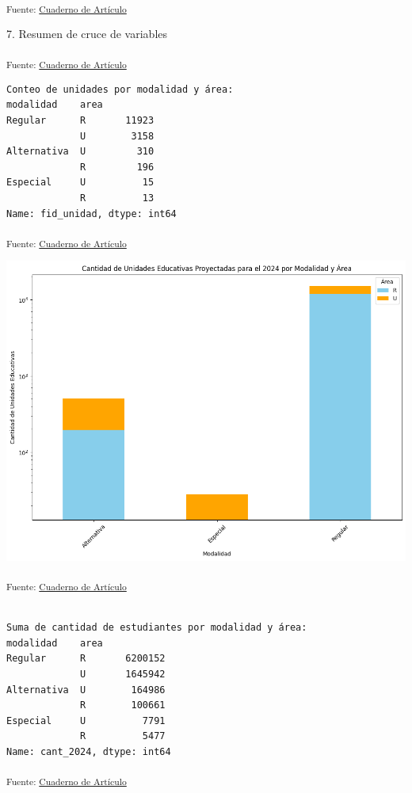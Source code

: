 \documentclass[
  12pt]{article}
\begin{document}
\textsubscript{Fuente: \href{sociest.org/index.ipynb.html}{Cuaderno de
Artículo}}

7. Resumen de cruce de variables

\textsubscript{Fuente: \href{sociest.org/index.ipynb.html}{Cuaderno de
Artículo}}

\begin{verbatim}
Conteo de unidades por modalidad y área:
modalidad    area
Regular      R       11923
             U        3158
Alternativa  U         310
             R         196
Especial     U          15
             R          13
Name: fid_unidad, dtype: int64
\end{verbatim}

\textsubscript{Fuente: \href{sociest.org/index.ipynb.html}{Cuaderno de
Artículo}}

\includegraphics{index_files/figure-pdf/cell-33-output-1.png}

\textsubscript{Fuente: \href{sociest.org/index.ipynb.html}{Cuaderno de
Artículo}}

\begin{verbatim}

Suma de cantidad de estudiantes por modalidad y área:
modalidad    area
Regular      R       6200152
             U       1645942
Alternativa  U        164986
             R        100661
Especial     U          7791
             R          5477
Name: cant_2024, dtype: int64
\end{verbatim}

\textsubscript{Fuente: \href{sociest.org/index.ipynb.html}{Cuaderno de
Artículo}}
\end{document}
